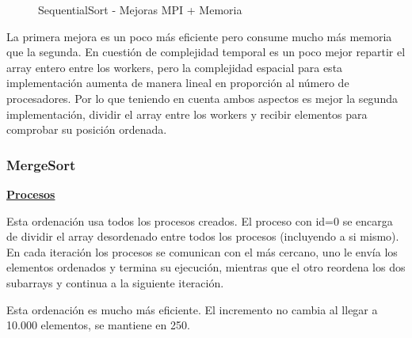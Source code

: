 \begin{figure}[h!]
			\caption{SequentialSort - Mejoras MPI + Memoria}
		\end{figure}
		
		La primera mejora es un poco más eficiente pero consume mucho más memoria que la segunda. En cuestión de complejidad temporal es un poco mejor repartir el array entero entre los workers, pero la complejidad espacial para esta implementación aumenta de manera lineal en proporción al número de procesadores. Por lo que teniendo en cuenta ambos aspectos es mejor la segunda implementación, dividir el array entre los workers y recibir elementos para comprobar su posición ordenada.
		
		
		\subsubsection{MergeSort}
		
		\begin{flushleft}
		\begin{mdframed}[roundcorner=5pt]			
			\textbf{\underline{Procesos}}
			\vspace{0.1cm}
			
			\scriptsize	
			Esta ordenación usa todos los procesos creados. El proceso con id=0 se encarga de dividir el array desordenado entre todos los procesos (incluyendo a si mismo). En cada iteración los procesos se comunican con el más cercano, uno le envía los elementos ordenados y termina su ejecución, mientras que el otro reordena los dos subarrays y continua a la siguiente iteración.
		
		\end{mdframed}
		\end{flushleft}		
		
		\begin{tcolorbox}[boxrule=0.5pt, fontupper=\small]
			\scriptsize
			Esta ordenación es mucho más eficiente. El incremento no cambia al llegar a 10.000 elementos, se mantiene en 250.		
		\end{tcolorbox}
		
